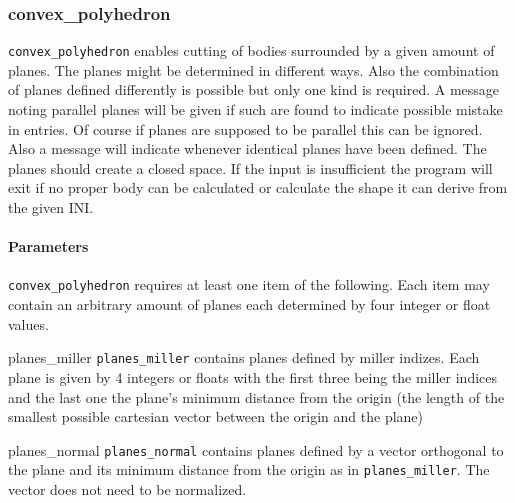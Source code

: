 \subsubsection{convex\_polyhedron}

\lstinline{convex_polyhedron} enables cutting of bodies surrounded by a given amount of planes. The planes might be determined in different ways. Also the combination of planes defined differently is possible but only one kind is required. A message noting parallel planes will be given if such are found to indicate possible mistake in entries. Of course if planes are supposed to be parallel this can be ignored. Also a message will indicate whenever identical planes have been defined. The planes should create a closed space. If the input is insufficient the program will exit if no proper body can be calculated or calculate the shape it can derive from the given INI.

\paragraph{Parameters}
\lstinline{convex_polyhedron} requires at least one item of the following. Each item may contain an arbitrary amount of planes each determined by four integer or float values.
\begin{description}
 \item{planes\_miller} \lstinline{planes_miller} contains planes defined by miller indizes. Each plane is given by 4 integers or floats with the first three being the miller indices and the last one the plane's minimum distance from the origin (the length of the smallest possible cartesian vector between the origin and the plane)
 \item{planes\_normal} \lstinline{planes_normal} contains planes defined by a vector orthogonal to the plane and its minimum distance from the origin as in \lstinline{planes_miller}. The vector does not need to be normalized.
\end{description} 

